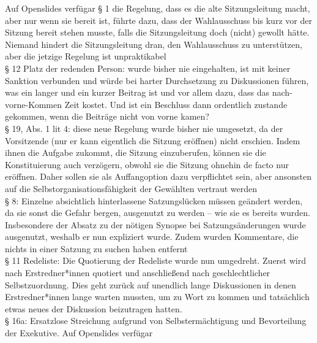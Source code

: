 {
    Auf Openslides verfügar
}{
    § 1 die Regelung, dass es die alte Sitzungsleitung macht, aber nur wenn sie bereit ist, führte dazu, dass der Wahlausschuss bis kurz vor der Sitzung bereit stehen musste, falls die Sitzungsleitung doch (nicht) gewollt hätte. Niemand hindert die Sitzungsleitung dran, den Wahlausschuss zu unterstützen, aber die jetzige Regelung ist unpraktikabel\\
    § 12 Platz der redenden Person: wurde bisher nie eingehalten, ist mit keiner Sanktion verbunden und würde bei harter Durchsetzung zu Diskussionen führen, was ein langer und ein kurzer Beitrag ist und vor allem dazu, dass das nach-vorne-Kommen Zeit kostet. Und ist ein Beschluss dann ordentlich zustande gekommen, wenn die Beiträge nicht von vorne kamen?\\
    § 19, Abs. 1 lit 4: diese neue Regelung wurde bisher nie umgesetzt, da der Vorsitzende (nur er kann eigentlich die Sitzung eröffnen) nicht erschien. Indem ihnen die Aufgabe zukommt, die Sitzung einzuberufen, können sie die Konstituierung auch verzögern, obwohl sie die Sitzung ohnehin de facto nur eröffnen. Daher sollen sie als Auffangoption dazu verpflichtet sein, aber ansonsten auf die Selbstorganisationsfähigkeit der Gewählten vertraut werden\\
    § 8: Einzelne absichtlich hinterlassene Satzungslücken müssen geändert werden, da sie sonst die Gefahr bergen, ausgenutzt zu werden – wie sie es bereits wurden. Insbesondere der Absatz zu der nötigen Synopse bei Satzungsänderungen wurde ausgenutzt, weshalb er nun expliziert wurde. Zudem wurden Kommentare, die nichts in einer Satzung zu suchen haben entfernt\\
    § 11 Redeliste: Die Quotierung der Redeliste wurde nun umgedreht. Zuerst wird nach Erstredner*innen quotiert und anschließend nach geschlechtlicher Selbstzuordnung. Dies geht zurück auf unendlich lange Diskussionen in denen Erstredner*innen lange warten mussten, um zu Wort zu kommen und tatsächlich etwas neues der Diskussion beizutragen hatten.\\
    § 16a: Ersatzlose Streichung aufgrund von Selbstermächtigung und Bevorteilung der Exekutive.
}{
}{
}
{
    Auf Openslides verfügar
}{
}{
}{
}
